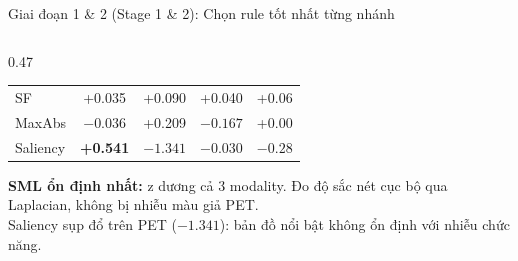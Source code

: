 \documentclass[t, aspectratio=169]{beamer}
\begin{document}
\begin{frame}{Giai đoạn 1 \& 2 (Stage 1 \& 2): Chọn rule tốt nhất từng nhánh}
\begin{columns}[T]
\begin{column}{0.47\textwidth}
{\begin{tabular}{lcccc}
                SF             & +0.035 & +0.090 & +0.040 & +0.06 \\
                MaxAbs         & $-0.036$ & +0.209 & $-0.167$ & +0.00 \\
                Saliency       & \textbf{+0.541} & $-1.341$ & $-0.030$ & $-0.28$ \\
                \bottomrule
            \end{tabular}}
            \vspace{0.2em}
            \small\textbf{SML ổn định nhất:} z dương cả 3 modality. Đo độ sắc nét cục bộ qua Laplacian, không bị nhiễu màu giả PET.\\
            \alert{Saliency sụp đổ trên PET} ($-1.341$): bản đồ nổi bật không ổn định với nhiễu chức năng.
        \end{column}
    \end{columns}
\end{frame}
\end{document}
